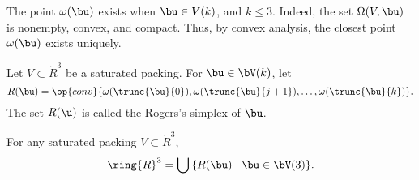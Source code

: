 The point $\omega(\bu)$ exists when $\bu\in V(k)$, and $k\le 3$.
Indeed, the set $\Omega(V, \bu)$ is nonempty, convex, and compact.  Thus, by
convex analysis, the closest point $\omega( \bu)$ exists uniquely.
%

\begin{definition}
Let $V\subset\ring{R}^3$ be a saturated packing. For $\bu\in \bV(k)$, let 
\begin{displaymath}
R(\bu) = \op{conv}\{\omega( \trunc{\bu}{0}), \omega(
\trunc{\bu}{j+1}),\ldots,\omega( \trunc{\bu}{k})\}.
\end{displaymath}
The set $R(\u)$ is called the Rogers's simplex of $\bu$.
%
\end{definition}

\begin{lemma}
For any saturated packing $V\subset\ring{R}^3$, 
\begin{displaymath}\ring{R}^3 = \bigcup\, \{ R(\bu) \mid \bu\in
\bV(3)\}.\end{displaymath}
\end{lemma}

